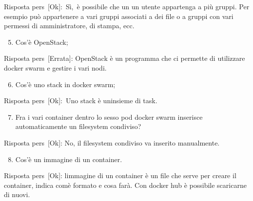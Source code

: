 \documentclass[
]{article}
\providecommand{\tightlist}{%
  \setlength{\itemsep}{0pt}\setlength{\parskip}{0pt}}
\begin{document}
{Risposta }{pers}{~{[}Ok{]}}{:}{~}{Sì,}{~è possibile che un un utente
appartenga a più gruppi. Per esempio può appartenere a vari gruppi
associati a dei file o a gruppi con vari permessi di amministratore, di
stampa, ecc.}

{}

{}

\begin{enumerate}
\setcounter{enumi}{4}
\tightlist
\item
  {Cos'è OpenStack;}
\end{enumerate}

{}

{Risposta pers}{~}{{[}Errata{]}}{: }{OpenStack è un programma che ci
permette di utilizzare docker swarm e gestire i vari nodi.}

{}

{}

\begin{enumerate}
\setcounter{enumi}{5}
\tightlist
\item
  {Cos'è uno stack in docker swarm;}
\end{enumerate}

{}

{Risposta }{pers}{~{[}Ok{]}}{:}{~}{Uno stack è
un\textquotesingle insieme di task.}

{}

\begin{enumerate}
\setcounter{enumi}{6}
\tightlist
\item
  {Fra i vari container dentro lo sesso pod docker swarm inserisce
  automaticamente un filesystem condiviso?}
\end{enumerate}

{}

{Risposta }{pers}{~{[}Ok{]}}{: }{No, il filesystem condiviso va inserito
manualmente.}

{}

\begin{enumerate}
\setcounter{enumi}{7}
\tightlist
\item
  {Cos'è un immagine di un container.}
\end{enumerate}

{}

{Risposta }{pers}{~{[}Ok{]}}{: }{l\textquotesingle immagine di un
container è un \textquotesingle file\textquotesingle{} che serve per
creare il container, indica com\textquotesingle è formato e cosa farà.
Con docker hub è possibile scaricarne di nuovi.}

{}
\end{document}
